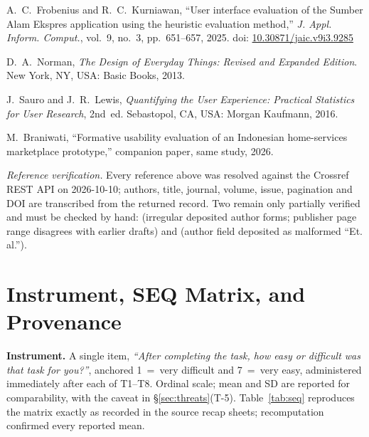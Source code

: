\documentclass[conference]{IEEEtran}
\begin{document}
\begin{thebibliography}{}
A.~C.~Frobenius and R.~C.~Kurniawan, ``User interface evaluation of the
Sumber Alam Ekspres application using the heuristic evaluation method,''
\emph{J. Appl. Inform. Comput.}, vol.~9, no.~3, pp.~651--657, 2025. doi:
\href{https://doi.org/10.30871/jaic.v9i3.9285}{10.30871/jaic.v9i3.9285}

D.~A.~Norman, \emph{The Design of Everyday Things: Revised and Expanded
Edition}. New York, NY, USA: Basic Books, 2013.

J.~Sauro and J.~R.~Lewis, \emph{Quantifying the User Experience: Practical
Statistics for User Research}, 2nd~ed. Sebastopol, CA, USA: Morgan
Kaufmann, 2016.

M.~Braniwati, ``Formative usability evaluation of an Indonesian
home-services marketplace prototype,'' companion paper, same study, 2026.
\end{thebibliography}

\noindent\scriptsize\textit{Reference verification.} Every reference
above was resolved against the Crossref REST API on 2026-10-10; authors,
title, journal, volume, issue, pagination and DOI are transcribed from the
returned record. Two remain only partially verified and must be checked by
hand: \cite{perdanakusuma} (irregular deposited author forms; publisher
page range disagrees with earlier drafts) and \cite{febriyanthi} (author
field deposited as malformed ``Et. al.'').

\appendices

\section{Instrument, SEQ Matrix, and Provenance}
\label{app:seq}

\textbf{Instrument.} A single item, \emph{``After completing the task, how
easy or difficult was that task for you?''}, anchored 1~=~very difficult
and 7~=~very easy, administered immediately after each of T1--T8. Ordinal
scale; mean and SD are reported for comparability, with the caveat in
\S\ref{sec:threats}(T-5). Table~\ref{tab:seq} reproduces the matrix exactly
as recorded in the source recap sheets; recomputation confirmed every
reported mean.
\end{document}
